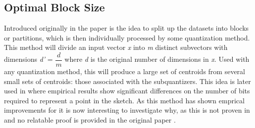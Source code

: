 \subsection{Optimal Block Size}
Introduced originally in the paper \cite{schmid9} is the idea to split up the datasets into blocks or partitions, which is then individually processed by some quantization method. This method will divide an input vector \textit{x} into \textit{m} distinct subvectors with dimensions \textit{d'} = $\dfrac{d}{m}$ where \textit{d} is the original number of dimensions in \textit{x}. Used with any quantization method, this will produce a large set of centroids from several small sets of centroids: those associated with the subquantizers. This idea is later used in \cite{wagner17} where empirical results show significant differences on the number of bits required to represent a point in the sketch. As this method has shown emprical improvements for \qs{} it is now interesting to investigate why, as this is not proven in \cite{wagner17} and no relatable proof is provided in the original paper \cite{schmid9}. 
